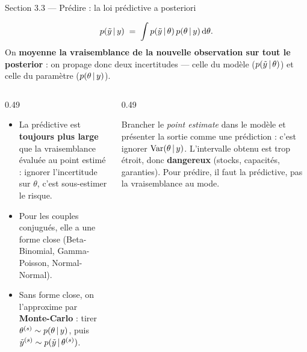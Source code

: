\begin{frame}{Section 3.3 --- Prédire : la loi prédictive a posteriori}
\small
\vspace{-1.5mm}
\begin{kbox}
\[
p(\tilde y \,\vert\, y) \;=\; \int p(\tilde y \,\vert\, \theta)\, p(\theta \,\vert\, y)\, \mathrm{d}\theta .
\]
On \textbf{moyenne la vraisemblance de la nouvelle observation sur tout le
posterior} : on propage donc deux incertitudes --- celle du modèle
($p(\tilde y \,\vert\, \theta)$) et celle du paramètre ($p(\theta \,\vert\, y)$).
\end{kbox}
\vspace{1mm}
\begin{columns}[t]
\begin{column}{0.49\textwidth}
\begin{ebox}
\begin{itemize}
  \item La prédictive est \textbf{toujours plus large} que la vraisemblance
        évaluée au point estimé : ignorer l'incertitude sur $\theta$, c'est
        sous-estimer le risque.
  \item Pour les couples conjugués, elle a une forme close
        (Beta-Binomial, Gamma-Poisson, Normal-Normal).
  \item Sans forme close, on l'approxime par \textbf{Monte-Carlo} :
        tirer $\theta^{(s)} \sim p(\theta \,\vert\, y)$, puis
        $\tilde y^{(s)} \sim p(\tilde y \,\vert\, \theta^{(s)})$.
\end{itemize}
\end{ebox}
\end{column}
\begin{column}{0.49\textwidth}
\begin{wbox}
\small Brancher le \emph{point estimate} dans le modèle et présenter la sortie
comme une prédiction : c'est ignorer $\mathrm{Var}(\theta \,\vert\, y)$. L'intervalle obtenu
est trop étroit, donc \textbf{dangereux} (stocks, capacités, garanties). Pour
prédire, il faut la prédictive, pas la vraisemblance au mode.
\end{wbox}
\end{column}
\end{columns}
\end{frame}

